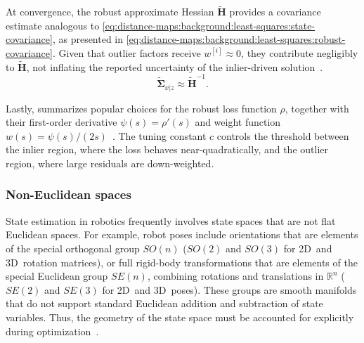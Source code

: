 

At convergence, the robust approximate Hessian $\mathbf{\tilde{H}}$ provides
a covariance estimate analogous to
\eqref{eq:distance-maps:background:least-squares:state-covariance}, as presented
in \eqref{eq:distance-maps:background:least-squares:robust-covariance}.
Given that outlier factors receive $w^{[i]} \approx 0$, they contribute
negligibly to $\mathbf{\tilde{H}}$, not inflating the reported uncertainty of
the inlier-driven solution~\cite{huber:book:1981}.
\begin{equation}
\label{eq:distance-maps:background:least-squares:robust-covariance}
\mathbf{\tilde{\Sigma}}_{x|z}
\approx \mathbf{\tilde{H}}^{-1}.
\end{equation}

Lastly, 
summarizes popular choices for the robust loss function $\rho$, together with
their first-order derivative  $\psi(s) = \rho'(s)$ and
weight function $w(s) = \psi(s)/(2s)$~\cite{babin:icra:2019}.
The tuning constant $c$ controls the threshold between the inlier region,
where the loss behaves near-quadratically, and the outlier region,
where large residuals are down-weighted.



\subsubsection{Non-Euclidean spaces}
\label{sec:distance-maps:background:least-squares:manifold}

State estimation in robotics frequently involves state spaces that are not
flat Euclidean spaces. For example, robot poses include orientations that
are elements of the special orthogonal group $SO(n)$ ($SO(2)$ and $SO(3)$
for 2D~and 3D~rotation matrices), or full rigid-body transformations that
are elements of the special Euclidean group $SE(n)$, combining rotations
and translations in $\mathbb{R}^{n}$ ($SE(2)$ and $SE(3)$ for 2D~and 3D~poses).
These groups are smooth manifolds that do not support
standard Euclidean addition and subtraction of state variables.
Thus, the geometry of the state space must be accounted for explicitly during
optimization~\cite{barfoot:book:2017,grisetti:robotics:2020}.

